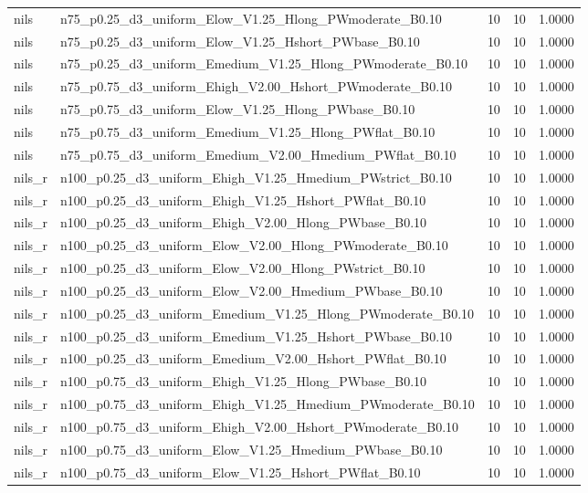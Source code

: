 \begin{tabular}{llrrr}
nils & n75_p0.25_d3_uniform_Elow_V1.25_Hlong_PWmoderate_B0.10 & 10 & 10 & 1.0000 \\
nils & n75_p0.25_d3_uniform_Elow_V1.25_Hshort_PWbase_B0.10 & 10 & 10 & 1.0000 \\
nils & n75_p0.25_d3_uniform_Emedium_V1.25_Hlong_PWmoderate_B0.10 & 10 & 10 & 1.0000 \\
nils & n75_p0.75_d3_uniform_Ehigh_V2.00_Hshort_PWmoderate_B0.10 & 10 & 10 & 1.0000 \\
nils & n75_p0.75_d3_uniform_Elow_V1.25_Hlong_PWbase_B0.10 & 10 & 10 & 1.0000 \\
nils & n75_p0.75_d3_uniform_Emedium_V1.25_Hlong_PWflat_B0.10 & 10 & 10 & 1.0000 \\
nils & n75_p0.75_d3_uniform_Emedium_V2.00_Hmedium_PWflat_B0.10 & 10 & 10 & 1.0000 \\
nils_r & n100_p0.25_d3_uniform_Ehigh_V1.25_Hmedium_PWstrict_B0.10 & 10 & 10 & 1.0000 \\
nils_r & n100_p0.25_d3_uniform_Ehigh_V1.25_Hshort_PWflat_B0.10 & 10 & 10 & 1.0000 \\
nils_r & n100_p0.25_d3_uniform_Ehigh_V2.00_Hlong_PWbase_B0.10 & 10 & 10 & 1.0000 \\
nils_r & n100_p0.25_d3_uniform_Elow_V2.00_Hlong_PWmoderate_B0.10 & 10 & 10 & 1.0000 \\
nils_r & n100_p0.25_d3_uniform_Elow_V2.00_Hlong_PWstrict_B0.10 & 10 & 10 & 1.0000 \\
nils_r & n100_p0.25_d3_uniform_Elow_V2.00_Hmedium_PWbase_B0.10 & 10 & 10 & 1.0000 \\
nils_r & n100_p0.25_d3_uniform_Emedium_V1.25_Hlong_PWmoderate_B0.10 & 10 & 10 & 1.0000 \\
nils_r & n100_p0.25_d3_uniform_Emedium_V1.25_Hshort_PWbase_B0.10 & 10 & 10 & 1.0000 \\
nils_r & n100_p0.25_d3_uniform_Emedium_V2.00_Hshort_PWflat_B0.10 & 10 & 10 & 1.0000 \\
nils_r & n100_p0.75_d3_uniform_Ehigh_V1.25_Hlong_PWbase_B0.10 & 10 & 10 & 1.0000 \\
nils_r & n100_p0.75_d3_uniform_Ehigh_V1.25_Hmedium_PWmoderate_B0.10 & 10 & 10 & 1.0000 \\
nils_r & n100_p0.75_d3_uniform_Ehigh_V2.00_Hshort_PWmoderate_B0.10 & 10 & 10 & 1.0000 \\
nils_r & n100_p0.75_d3_uniform_Elow_V1.25_Hmedium_PWbase_B0.10 & 10 & 10 & 1.0000 \\
nils_r & n100_p0.75_d3_uniform_Elow_V1.25_Hshort_PWflat_B0.10 & 10 & 10 & 1.0000 \\

\end{tabular}
